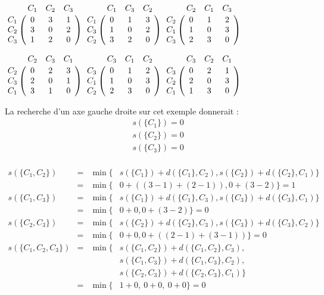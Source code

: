 \documentclass[11pt, a4paper]{article}
\begin{document}
\begin{center}
$\bordermatrix{
& C_1 & C_2 & C_3 \cr
C_1 & 0 & 3 & 1 \cr
C_2 & 3 & 0 & 2 \cr
C_3 & 1 & 2 & 0}
~
\bordermatrix{
& C_1 & C_3 & C_2 \cr
C_1 & 0 & 1 & 3 \cr
C_3 & 1 & 0 & 2 \cr
C_2 & 3 & 2 & 0}
~
\bordermatrix{
& C_2 & C_1 & C_3 \cr
C_2 & 0 & 1 & 2 \cr
C_1 & 1 & 0 & 3 \cr
C_3 & 2 & 3 & 0}$

\vspace{0.5cm}

$\bordermatrix{
& C_2 & C_3 & C_1 \cr
C_2 & 0 & 2 & 3 \cr
C_3 & 2 & 0 & 1 \cr
C_1 & 3 & 1 & 0}
~
\bordermatrix{
& C_3 & C_1 & C_2 \cr
C_3 & 0 & 1 & 2 \cr
C_1 & 1 & 0 & 3 \cr
C_2 & 2 & 3 & 0}
~
\bordermatrix{
& C_3 & C_2 & C_1 \cr
C_3 & 0 & 2 & 1 \cr
C_2 & 2 & 0 & 3 \cr
C_1 & 1 & 3 & 0}
$\\[0.5cm]
\end{center}

La recherche d'un axe gauche droite sur cet exemple donnerait :
\begin{equation*}
\begin{aligned}
    &s(\{C_1\}) = 0\\
    &s(\{C_2\}) = 0\\
    &s(\{C_3\}) = 0\\
\end{aligned}
\end{equation*}

\begin{equation*}
\begin{aligned}
    s(\{C_1, C_2\}) &= &\min \{&s(\{C_1\}) + d(\{C_1\}, C_2), s(\{C_2\}) + d(\{C_2\}, C_1)\}\\
    &= &\min \{&0 + ((3-1) + (2-1)), 0 + (3-2)\} = 1\\[0.5cm]
    s(\{C_1, C_3\}) &= &\min \{&s(\{C_1\}) + d(\{C_1\}, C_3), s(\{C_3\}) + d(\{C_3\}, C_1)\}\\
    &= &\min \{&0 + 0, 0 + (3-2)\} = 0\\[0.5cm]
    s(\{C_2, C_3\}) &= &\min \{&s(\{C_2\}) + d(\{C_2\}, C_3), s(\{C_3\}) + d(\{C_3\}, C_2)\}\\
    &= &\min \{&0 + 0, 0 + ((2-1) + (3-1))\} = 0\\[0.5cm]
    s(\{C_1,C_2,C_3\}) &= &\min \{&s(\{C_1, C_2\}) + d(\{C_1, C_2\}, C_3),\\
    &&&s(\{C_1,C_3\}) + d(\{C_1,C_3\}, C_2),\\
    &&&s(\{C_2, C_3\}) + d(\{C_2, C_3\}, C_1)\}\\
    &= &\min \{&1 + 0,\ 0 + 0,\ 0 + 0\} = 0\qquad\quad
\end{aligned}
\end{equation*}
\end{document}
